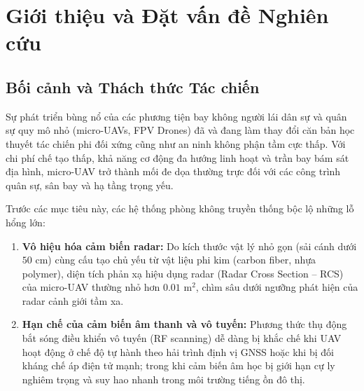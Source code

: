 \documentclass[11pt,a4paper]{article}
\begin{document}
\newpage
\tableofcontents
\newpage

\section{Giới thiệu và Đặt vấn đề Nghiên cứu}

\subsection{Bối cảnh và Thách thức Tác chiến}
Sự phát triển bùng nổ của các phương tiện bay không người lái dân sự và quân sự quy mô nhỏ (micro-UAVs, FPV Drones) đã và đang làm thay đổi căn bản học thuyết tác chiến phi đối xứng cũng như an ninh không phận tầm cực thấp. Với chi phí chế tạo thấp, khả năng cơ động đa hướng linh hoạt và trần bay bám sát địa hình, micro-UAV trở thành mối đe dọa thường trực đối với các công trình quân sự, sân bay và hạ tầng trọng yếu. 

Trước các mục tiêu này, các hệ thống phòng không truyền thống bộc lộ những lỗ hổng lớn:
\begin{enumerate}[label=(\roman*)]
    \item \textbf{Vô hiệu hóa cảm biến radar:} Do kích thước vật lý nhỏ gọn (sải cánh dưới $50\text{ cm}$) cùng cấu tạo chủ yếu từ vật liệu phi kim (carbon fiber, nhựa polymer), diện tích phản xạ hiệu dụng radar (Radar Cross Section -- RCS) của micro-UAV thường nhỏ hơn $0.01\text{ m}^2$, chìm sâu dưới ngưỡng phát hiện của radar cảnh giới tầm xa.
    \item \textbf{Hạn chế của cảm biến âm thanh và vô tuyến:} Phương thức thụ động bắt sóng điều khiển vô tuyến (RF scanning) dễ dàng bị khắc chế khi UAV hoạt động ở chế độ tự hành theo hải trình định vị GNSS hoặc khi bị đối kháng chế áp điện tử mạnh; trong khi cảm biến âm học bị giới hạn cự ly nghiêm trọng và suy hao nhanh trong môi trường tiếng ồn đô thị.
\end{enumerate}
\end{document}
